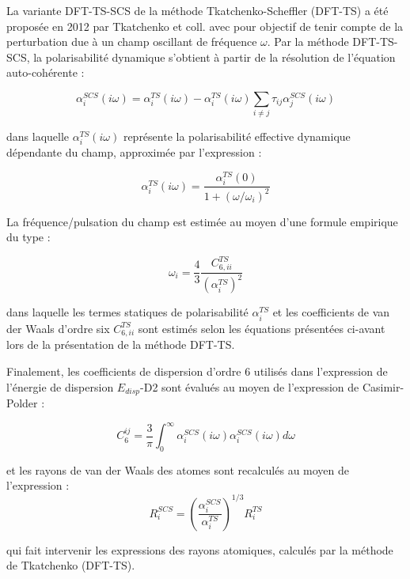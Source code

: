 \documentclass[12pt,a4paper]{book}
\begin{document}
{	La variante DFT-TS-SCS de la méthode Tkatchenko-Scheffler (DFT-TS) a été proposée en 2012 par Tkatchenko et coll.\cite{tkatchenko2012accurate} avec pour objectif de tenir compte de la perturbation due à un champ oscillant de fréquence $\omega$. Par la méthode DFT-TS-SCS, la polarisabilité dynamique s'obtient à partir de la résolution de l’équation auto-cohérente :
	
	\begin{equation}
	\alpha_{i}^{SCS}(i \omega) = \alpha_{i}^{TS}(i \omega) - \alpha_{i}^{TS}(i \omega) \sum_{i\neq j} \tau_{ij} \alpha_{j}^{SCS}(i \omega)
	\end{equation} 
	
	dans laquelle $\alpha_{i}^{TS}(i \omega)$ représente la polarisabilité effective dynamique dépendante du champ, approximée par l’expression : 
	
	\begin{equation}
	\alpha_{i}^{TS}(i \omega) = \frac{\alpha_{i}^{TS}(0)}{1 + (\omega/\omega_{i})^{2}}
	\end{equation}
	
	La fréquence/pulsation du champ est estimée au moyen d’une formule empirique du type : 
	
	\begin{equation}
	\omega_{i} = \frac{4}{3} \frac{C_{6,ii}^{TS}}{(\alpha_{i}^{TS})^{2}}
	\end{equation}
	
	dans laquelle les termes statiques de polarisabilité $\alpha_{i}^{TS}$ et les coefficients de van der Waals d’ordre six $C_{6,ii}^{TS}$ sont estimés selon les équations présentées ci-avant lors de la présentation de la méthode DFT-TS.
	
	Finalement, les coefficients de dispersion d’ordre 6 utilisés dans l’expression de l’énergie de dispersion $E_{disp}$-D2 sont évalués au moyen de l’expression de Casimir-Polder :
	
	\begin{equation}
	C_{6}^{ij} = \frac{3}{\pi} \int_{0}^{\infty} \alpha_{i}^{SCS} (i\omega) \alpha_{i}^{SCS} (i\omega) d\omega
	\end{equation}
	
	et les rayons de van der Waals des atomes sont recalculés au moyen de l’expression : 	
	\begin{equation}
	R_{i}^{SCS} = \left(\frac{\alpha_{i}^{SCS}}{\alpha_{i}^{TS}}\right)^{1/3} R_{i}^{TS}
	\end{equation}
	
	\noindent qui fait intervenir les expressions des rayons atomiques, calculés par la méthode de Tkatchenko (DFT-TS).

}
\end{document}
